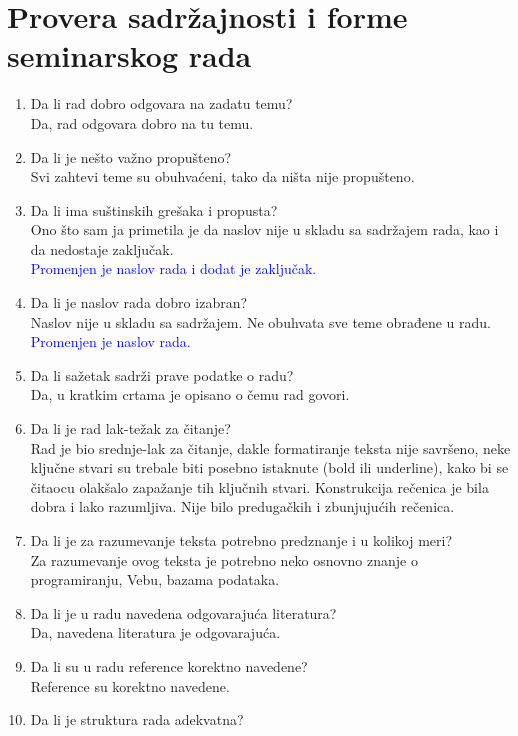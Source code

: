 \documentclass[a4paper]{report}
\newcommand{\odgovor}[1]{\textcolor{blue}{#1}}
\begin{document}
\section{Provera sadržajnosti i forme seminarskog rada}

\begin{enumerate}
\item Da li rad dobro odgovara na zadatu temu?\\
Da, rad odgovara dobro na tu temu.
\item Da li je nešto važno propušteno?\\
Svi zahtevi teme su obuhvaćeni, tako da ništa nije propušteno.
\item Da li ima suštinskih grešaka i propusta?\\
Ono što sam ja primetila je da naslov nije u skladu sa sadržajem rada, kao i da nedostaje zaključak.\\
\odgovor{Promenjen je naslov rada i dodat je zaključak.}
\item Da li je naslov rada dobro izabran?\\
Naslov nije u skladu sa sadržajem. Ne obuhvata sve teme obrađene u radu.\\
\odgovor{Promenjen je naslov rada.}
\item Da li sažetak sadrži prave podatke o radu?\\
Da, u kratkim crtama je opisano o čemu rad govori.
\item Da li je rad lak-težak za čitanje?\\
Rad je bio srednje-lak za čitanje, dakle formatiranje teksta nije savršeno, neke ključne stvari su trebale biti posebno istaknute (bold ili underline), kako bi se čitaocu olakšalo zapažanje tih ključnih stvari. Konstrukcija rečenica je bila dobra i lako razumljiva. Nije bilo predugačkih i zbunjujućih rečenica.
\item Da li je za razumevanje teksta potrebno predznanje i u kolikoj meri?\\
Za razumevanje ovog teksta je potrebno neko osnovno znanje o programiranju, Vebu, bazama podataka.
\item Da li je u radu navedena odgovarajuća literatura?\\
Da, navedena literatura je odgovarajuća.
\item Da li su u radu reference korektno navedene?\\
Reference su korektno navedene.
\item Da li je struktura rada adekvatna?\\

\end{enumerate}
\end{document}
